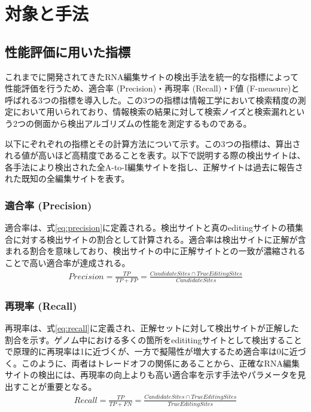 \section{対象と手法}
\subsection{性能評価に用いた指標}
これまでに開発されてきたRNA編集サイトの検出手法を統一的な指標によって性能評価を行うため、適合率 (Precision)・再現率 (Recall)・F値 (F-measure)と呼ばれる3つの指標を導入した。この3つの指標は情報工学において検索精度の測定において用いられており、情報検索の結果に対して検索ノイズと検索漏れという2つの側面から検出アルゴリズムの性能を測定するものである。
\par
以下にぞれぞれの指標とその計算方法について示す。この3つの指標は、算出される値が高いほど高精度であることを表す。以下で説明する際の検出サイトは、各手法により検出された全A-to-I編集サイトを指し、正解サイトは過去に報告された既知の全編集サイトを表す。

\subsubsection{適合率 (Precision)}
適合率は、式\ref{eq:precision}に定義される。検出サイトと真のeditingサイトの積集合に対する検出サイトの割合として計算される。適合率は検出サイトに正解が含まれる割合を意味しており、検出サイトの中に正解サイトとの一致が濃縮されることで高い適合率が達成される。
\begin{eqnarray}
	Precision = \frac{TP}{TP + FP} = \frac{CandidateSites \cap TrueEditingSites}{CandidateSites}
	\label{eq:precision}
\end{eqnarray}

\subsubsection{再現率 (Recall)}
再現率は、式\ref{eq:recall}に定義され、正解セットに対して検出サイトが正解した割合を示す。ゲノム中における多くの箇所をedititingサイトとして検出することで原理的に再現率は1に近づくが、一方で擬陽性が増大するため適合率は0に近づく。このように、両者はトレードオフの関係にあることから、正確なRNA編集サイトの検出には、再現率の向上よりも高い適合率を示す手法やパラメータを見出すことが重要となる。
\begin{eqnarray}
	Recall = \frac{TP}{TP+FN}
	= \frac{CandidateSites \cap TrueEditingSites}{TrueEditingSites}
	\label{eq:recall}
\end{eqnarray}

